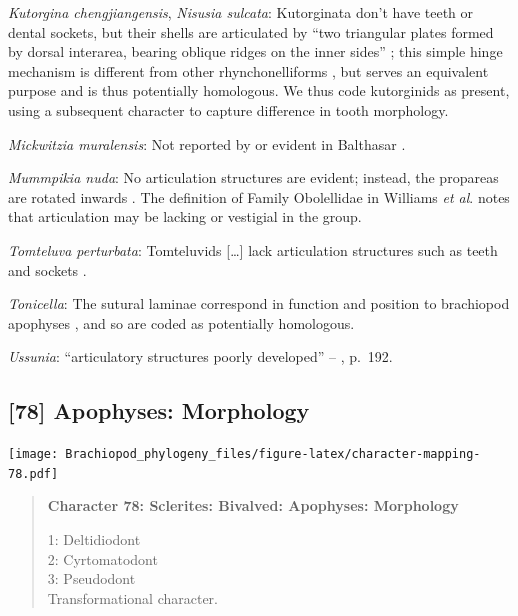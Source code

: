 \documentclass[openany]{book}
\begin{document}
\hypertarget{Kutorgina_chengjiangensis-coding-77}{}
\emph{Kutorgina chengjiangensis}, \emph{Nisusia sulcata}: Kutorginata
don't have teeth or dental sockets, but their shells are articulated by
``two triangular plates formed by dorsal interarea, bearing oblique
ridges on the inner sides''
\citep[p.~211]{Williams2000LinguliformeaCraniiformea}; this simple hinge
mechanism is different from other rhynchonelliforms
\citep[p.208]{Williams2000LinguliformeaCraniiformea}, but serves an
equivalent purpose and is thus potentially homologous. We thus code
kutorginids as present, using a subsequent character to capture
difference in tooth morphology.

\hypertarget{Mickwitzia_muralensis-coding-77}{}
\emph{Mickwitzia muralensis}: Not reported by or evident in Balthasar
\citeyearpar{Balthasar2004Shellstructure}.

\hypertarget{Mummpikia_nuda-coding-77}{}
\emph{Mummpikia nuda}: No articulation structures are evident; instead,
the propareas are rotated inwards \citep{Balthasar2008iMummpikia}. The
definition of Family Obolellidae in Williams \emph{et al}.
\citeyearpar{Williams2000LinguliformeaCraniiformea} notes that
articulation may be lacking or vestigial in the group.

\hypertarget{Tomteluva_perturbata-coding-77}{}
\emph{Tomteluva perturbata}: Tomteluvids {[}\ldots{}{]} lack
articulation structures such as teeth and sockets
\citep{Streng2016Anew}.

\hypertarget{Tonicella-coding-77}{}
\emph{Tonicella}: The sutural laminae correspond in function and
position to brachiopod apophyses \citep{Connors2012}, and so are coded
as potentially homologous.

\hypertarget{Ussunia-coding-77}{}
\emph{Ussunia}: ``articulatory structures poorly developed'' --
\citet{Williams2000LinguliformeaCraniiformea}, p.~192.

\subsection*{{[}78{]} Apophyses: Morphology}\label{apophyses-morphology}

\texttt{[image: Brachiopod\_phylogeny\_files/figure-latex/character-mapping-78.pdf]}

\begin{quote}
\textbf{Character 78: Sclerites: Bivalved: Apophyses: Morphology}

1: Deltidiodont\\
2: Cyrtomatodont\\
3: Pseudodont\\
Transformational character.
\end{quote}
\end{document}
